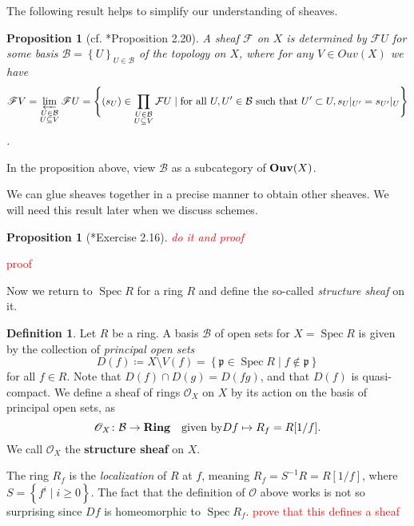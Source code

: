 \documentclass[11pt,leqno]{article}
\newcommand{\sai}[1]{\textcolor{red}{#1}}
\theoremstyle{plain}
\newtheorem{proposition}[lem]{Proposition}
\theoremstyle{definition}
\newtheorem{definition/}[lem]{Definition}
\newenvironment{definition}
  {\renewcommand{\qedsymbol}{\textdagger}%
   \pushQED{\qed}\begin{definition/}}
  {\popQED\end{definition/}}
\numberwithin{equation}{section}
\numberwithin{lem}{section}
\newcommand{\cbr}[1]{\left\{#1\right\}}
\newcommand{\bidx}[1]{\textbf{#1\index{#1}}} %
\DeclareMathOperator{\Spec}{Spec}
\newcommand{\catname}[1]{{\normalfont\mathbf{#1}}}
\newcommand{\Ring}{\catname{Ring}}
\newcommand{\Ouv}{\catname{Ouv}}
\begin{document}
The following result helps to simplify our understanding of sheaves.
\begin{proposition}[cf. \cite{gw}*{Proposition 2.20}]
    A sheaf $\mathscr F$ on $X$ is determined by $\mathscr FU$ for some basis $\mathcal B = \cbr{U}_{U\in\mathcal B}$ of the topology on $X$, where for any $V\in Ouv(X)$ we have 
    \begin{equation}
        \mathscr FV = \varprojlim_{\substack{U\in \mathcal B\\U\subseteq V}}\mathscr FU = \Bigg\{(s_U)\in \prod_{\substack{U\in \mathcal B\\U\subseteq V}}\mathcal FU\mid \text{for all }U,U^\prime\in\mathcal B \text{ such that } U^\prime\subset U, s_U|_{U^\prime} = s_{U^\prime}|_U\Bigg\}
    \end{equation}.
\end{proposition}
In the proposition above, view $\mathcal B$ as a subcategory of $\Ouv(X)$.

We can glue sheaves together in a precise manner to obtain other sheaves. We will need this result later when we discuss schemes.
\begin{proposition}[\cite{gw}*{Exercise 2.16}]
    \sai{do it and proof}
\end{proposition}
\sai{proof}

Now we return to $\Spec R$ for a ring $R$ and define the so-called \textit{structure sheaf} on it.
\begin{definition}
    Let $R$ be a ring. A basis $\mathcal B$ of open sets for $X=\Spec R$ is given by the collection of \textit{principal open sets} 
    \begin{equation}
        D(f) \coloneqq X\setminus V(f) = \cbr{\mathfrak p\in\Spec R\mid f\not\in \mathfrak p}
    \end{equation}
    for all $f\in R$. Note that $D(f)\cap D(g) = D(fg)$, and that $D(f)$ is quasi-compact.
    We define a sheaf of rings \bidx{$\mathscr O_X$} on $X$ by its action on the basis of principal open sets, as
    \begin{equation}
        \mathscr O_X\colon \mathcal B\to \Ring \quad\text{given by} Df\mapsto R_f = R[1/f].
    \end{equation}
    We call $\mathscr O_X$ the \bidx{structure sheaf} on $X$.
\end{definition}
The ring $R_f$ is the \textit{localization} of $R$ at $f$, meaning $R_f = S^{-1}R = R[1/f]$, where $S = \cbr{f^i\mid i\geq 0}$. The fact that the definition of $\mathscr O$ above works is not so surprising since $Df$ is homeomorphic to $\Spec R_f$.
\sai{prove that this defines a sheaf}
\end{document}
